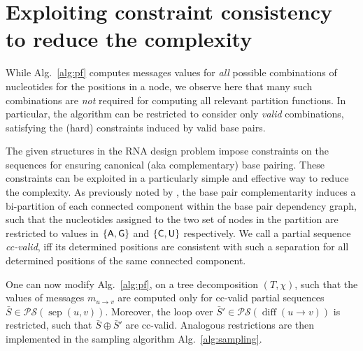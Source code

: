 \documentclass[10pt]{article}
\newcommand{\val}{\bar S} %
\newcommand{\separator}[2]{\operatorname{sep}(#1,#2)}
\newcommand{\difference}[2]{\operatorname{diff}(#1 \rightarrow #2)}
\newcommand{\Message}[2]{m_{#1\rightarrow #2}}
\newcommand{\partseqs}{\mathcal{P\!S}}
\newcommand{\Def}[1]{\emph{#1}}
\newcommand{\Nuc}[1]{{\sf #1}}
\newcommand{\Ab}{\Nuc{A}}
\newcommand{\Cb}{\Nuc{C}}
\newcommand{\Gb}{\Nuc{G}}
\newcommand{\Ub}{\Nuc{U}}
\newcommand{\substitute}[2]{#1\!\oplus\!#2}
\newcommand{\citet}[1]{\cite{#1}}
\begin{document}
\section{Exploiting constraint consistency to reduce the complexity}\label{sec:improvedComplexity}


While Alg.~\ref{alg:pf} computes messages values for
\emph{all} possible combinations of nucleotides for the positions
in a node,
we observe here that many such combinations are \emph{not} required for computing all relevant
partition functions. In particular, the algorithm can be restricted to
consider only \Def{valid} combinations, satisfying the (hard)
constraints induced by valid base pairs.

The given structures in the RNA design problem impose constraints on
the sequences for ensuring canonical (aka complementary)
base pairing. These constraints can be exploited in a particularly
simple and effective way to reduce the complexity.  As previously
noted by \citet{Flamm2001}, the base pair complementarity induces a
bi-partition of each connected component within the base pair
dependency graph, such that the nucleotides assigned to the two set of
nodes in the partition are restricted to values in $\{\Ab,\Gb\}$ and
$\{\Cb,\Ub\}$ respectively. We call a partial sequence \Def{cc-valid},
iff its determined positions are consistent with such a separation for
all determined positions of the same connected component.


One can now modify Alg.~\ref{alg:pf}, on a tree decomposition
$(T,\chi)$, such that the values of messages
$\Message{u}{v}$ are computed only for cc-valid
partial sequences $\val\in\partseqs(\separator{u}{v})$. Moreover, the
loop over $\val'\in\partseqs(\difference{u}{v})$ is restricted, such
that $\substitute{\val}{\val'}$ are cc-valid. Analogous restrictions are
then implemented in the sampling algorithm Alg.~\ref{alg:sampling}.
\end{document}
